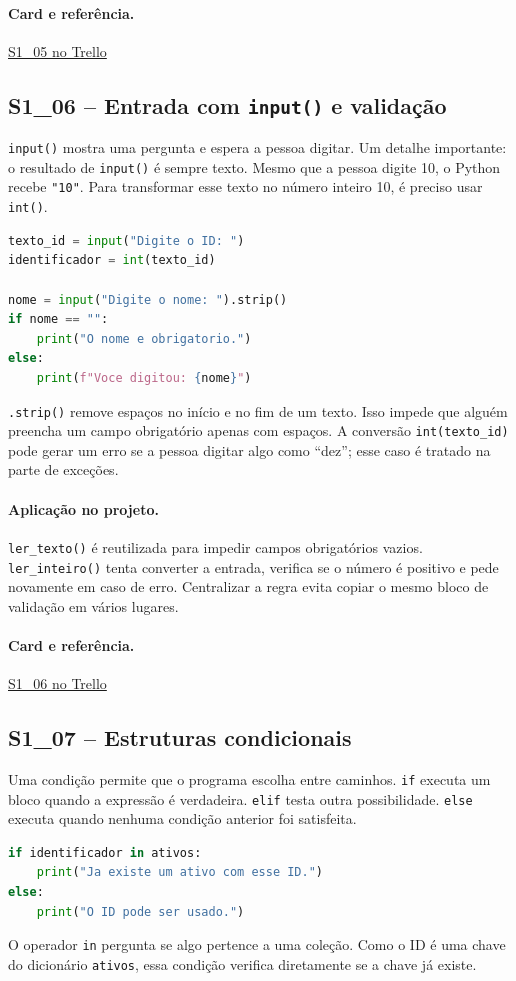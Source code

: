 \documentclass[11pt,a4paper]{article}
\newcommand{\projeto}{\paragraph{Aplicação no projeto.}}
\newcommand{\referencia}[2]{\paragraph{Card e referência.}\href{#1}{#2}}
\newcommand{\cardsection}[1]{\Needspace{12\baselineskip}\subsection{#1}}
\begin{document}
\referencia{https://trello.com/c/DmvtABXt}{S1\_05 no Trello}

\cardsection{S1\_06 -- Entrada com \texttt{input()} e validação}

\texttt{input()} mostra uma pergunta e espera a pessoa digitar. Um detalhe importante: o resultado de \texttt{input()} é sempre texto. Mesmo que a pessoa digite 10, o Python recebe \texttt{"10"}. Para transformar esse texto no número inteiro 10, é preciso usar \texttt{int()}.

\begin{lstlisting}[language=Python,caption={Entrada de texto e conversão para inteiro}]
texto_id = input("Digite o ID: ")
identificador = int(texto_id)

nome = input("Digite o nome: ").strip()
if nome == "":
    print("O nome e obrigatorio.")
else:
    print(f"Voce digitou: {nome}")
\end{lstlisting}

\texttt{.strip()} remove espaços no início e no fim de um texto. Isso impede que alguém preencha um campo obrigatório apenas com espaços. A conversão \texttt{int(texto\_id)} pode gerar um erro se a pessoa digitar algo como ``dez''; esse caso é tratado na parte de exceções.

\projeto
\texttt{ler\_texto()} é reutilizada para impedir campos obrigatórios vazios. \texttt{ler\_inteiro()} tenta converter a entrada, verifica se o número é positivo e pede novamente em caso de erro. Centralizar a regra evita copiar o mesmo bloco de validação em vários lugares.

\referencia{https://trello.com/c/fFlJ9zCj}{S1\_06 no Trello}

\cardsection{S1\_07 -- Estruturas condicionais}

Uma condição permite que o programa escolha entre caminhos. \texttt{if} executa um bloco quando a expressão é verdadeira. \texttt{elif} testa outra possibilidade. \texttt{else} executa quando nenhuma condição anterior foi satisfeita.

\begin{lstlisting}[language=Python,caption={Condição para impedir ID duplicado}]
if identificador in ativos:
    print("Ja existe um ativo com esse ID.")
else:
    print("O ID pode ser usado.")
\end{lstlisting}

O operador \texttt{in} pergunta se algo pertence a uma coleção. Como o ID é uma chave do dicionário \texttt{ativos}, essa condição verifica diretamente se a chave já existe.
\end{document}
